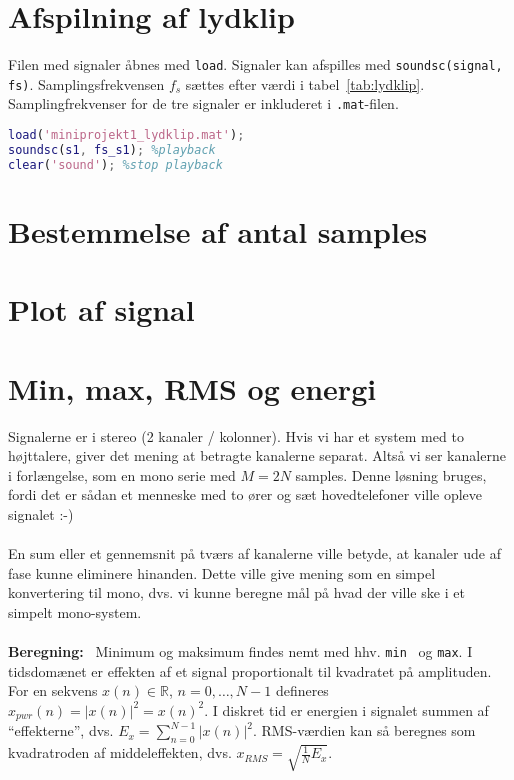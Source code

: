 \documentclass[a4paper]{report}
\begin{document}
\section{Afspilning af lydklip}

        \begin{par}

Filen med signaler åbnes med \texttt{load}.
Signaler kan afspilles med \texttt{soundsc(signal, fs)}.
Samplingsfrekvensen $f_s$ sættes efter værdi i tabel~\ref{tab:lydklip}.
Samplingfrekvenser for de tre signaler er inkluderet i
\texttt{.mat}-filen.

\end{par} 

\begin{lstlisting}[language=Matlab, style=Matlab-editor]
load('miniprojekt1_lydklip.mat');
soundsc(s1, fs_s1); %playback
clear('sound'); %stop playback
\end{lstlisting}



\section{Bestemmelse af antal samples}

        


\section{Plot af signal}

        


\section{Min, max, RMS og energi}

        \begin{par}

Signalerne er i stereo (2 kanaler / kolonner).
Hvis vi har et system med to højttalere, giver det mening at betragte
kanalerne separat.
Altså vi ser kanalerne i forlængelse, som en mono serie med $M=2N$
samples. Denne løsning bruges, fordi det er sådan et menneske med to ører
og sæt hovedtelefoner ville opleve signalet :-) \\\\
En sum eller et gennemsnit på tværs af kanalerne ville betyde, at kanaler
ude af fase kunne eliminere hinanden.
Dette ville give mening som en simpel konvertering til mono, dvs. vi
kunne beregne mål på hvad der ville ske i et simpelt mono-system.\\\\
\textbf{Beregning:}~ Minimum og maksimum findes nemt med hhv. \texttt{min}~ og \texttt{max}.
I tidsdomænet er effekten af et signal proportionalt til kvadratet på
amplituden. For en sekvens $x(n) \in \mathbb{R}$, $n = 0,\ldots,N-1$
defineres $x_{pwr}(n) = |x(n)|^2 = x(n)^2 $.
I diskret tid er energien i signalet summen af ``effekterne'', dvs.
$E_x = \sum_{n=0}^{N-1} |x(n)|^2 $.
RMS-værdien kan så beregnes som kvadratroden af middeleffekten, dvs.
$x_{RMS} = \sqrt{\frac{1}{N}E_x}$.\\\\

\end{par} 
\end{document}
